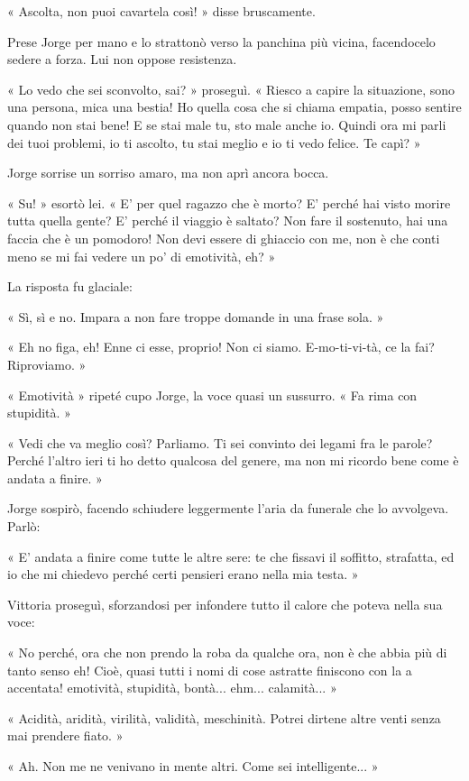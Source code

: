 « Ascolta, non puoi cavartela così! » disse bruscamente.

Prese Jorge per mano e lo strattonò verso la panchina più vicina, facendocelo sedere a forza. Lui non oppose resistenza.

« Lo vedo che sei sconvolto, sai? » proseguì. « Riesco a capire la situazione, sono una persona, mica una bestia! Ho quella cosa che si chiama empatia, posso sentire quando non stai bene! E se stai male tu, sto male anche io. Quindi ora mi parli dei tuoi problemi, io ti ascolto, tu stai meglio e io ti vedo felice. Te capì? »

Jorge sorrise un sorriso amaro, ma non aprì ancora bocca.

« Su! » esortò lei. « E' per quel ragazzo che è morto? E' perché hai visto morire tutta quella gente? E' perché il viaggio è saltato? Non fare il sostenuto, hai una faccia che è un pomodoro! Non devi essere di ghiaccio con me, non è che conti meno se mi fai vedere un po' di emotività, eh? »

La risposta fu glaciale:

« Sì, sì e no. Impara a non fare troppe domande in una frase sola. »

« Eh no figa, eh! Enne ci esse, proprio! Non ci siamo. E-mo-ti-vi-tà, ce la fai? Riproviamo. »

« Emotività » ripeté cupo Jorge, la voce quasi un sussurro. « Fa rima con stupidità. »

« Vedi che va meglio così? Parliamo. Ti sei convinto dei legami fra le parole? Perché l'altro ieri ti ho detto qualcosa del genere, ma non mi ricordo bene come è andata a finire. »

Jorge sospirò, facendo schiudere leggermente l'aria da funerale che lo avvolgeva. Parlò:

« E' andata a finire come tutte le altre sere: te che fissavi il soffitto, strafatta, ed io che mi chiedevo perché certi pensieri erano nella mia testa. »

Vittoria proseguì, sforzandosi per infondere tutto il calore che poteva nella sua voce:

« No perché, ora che non prendo la roba da qualche ora, non è che abbia più di tanto senso eh! Cioè, quasi tutti i nomi di cose astratte finiscono con la a accentata! emotività, stupidità, bontà... ehm... calamità... »

« Acidità, aridità, virilità, validità, meschinità. Potrei dirtene altre venti senza mai prendere fiato. »

« Ah. Non me ne venivano in mente altri. Come sei intelligente... »

